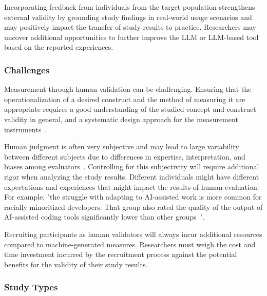 Incorporating feedback from individuals from the target population strengthens external validity by grounding study findings in real-world usage scenarios and may positively impact the transfer of study results to practice.
Researchers may uncover additional opportunities to further improve the LLM or LLM-based tool based on the reported experiences.

\subsubsection{Challenges}

Measurement through human validation can be challenging.
Ensuring that the operationalization of a desired construct and the method of measuring it are appropriate requires a good understanding of the studied concept and construct validity in general, and a systematic design approach for the measurement instruments~\cite{DBLP:journals/tse/SjobergB23}.

Human judgment is often very subjective and may lead to large variability between different subjects due to differences in expertise, interpretation, and biases among evaluators~\cite{DBLP:journals/pacmhci/McDonaldSF19}.
Controlling for this subjectivity will require additional rigor when analyzing the study results.
Different individuals might have different expectations and experiences that might impact the results of human evaluation. For example, "the struggle with adapting to AI-assisted work is more common for racially minoritized developers. That group also rated the quality of the output of AI-assisted coding tools significantly lower than other groups~\cite{hicks_lee_foster-marks_2025}".

Recruiting participants as human validators will always incur additional resources compared to machine-generated measures.
Researchers must weigh the cost and time investment incurred by the recruitment process against the potential benefits for the validity of their study results.

\subsubsection{Study Types}


